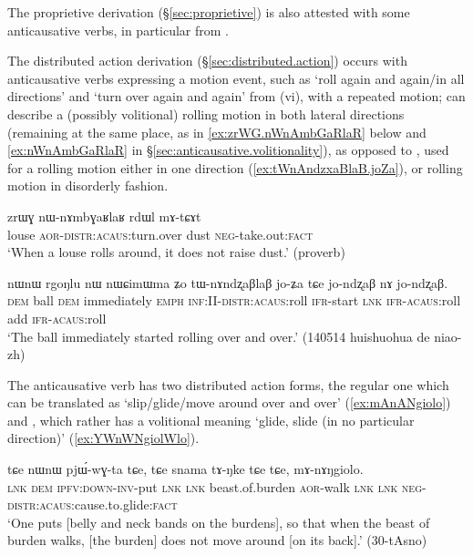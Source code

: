 The proprietive  derivation (§\ref{sec:proprietive}) is also attested with some anticausative verbs, in particular  from .

The distributed action derivation (§\ref{sec:distributed.action}) occurs with anticausative verbs expressing a motion event, such as  `roll again and again/in all directions' and  `turn over again and again'  from   (vi), with a repeated motion;  can describe a (possibly volitional) rolling motion in both lateral directions (remaining at the same place, as in \ref{ex:zrWG.nWnAmbGaRlaR} below and \ref{ex:nWnAmbGaRlaR} in §\ref{sec:anticausative.volitionality}), as opposed to , used for a rolling motion either in one direction (\ref{ex:tWnAndzxaBlaB.joZa}), or  rolling motion in disorderly fashion.

\begin{exe}
\ex \label{ex:zrWG.nWnAmbGaRlaR}
\gll  zrɯɣ nɯ-nɤmbɣaʁlaʁ rdɯl mɤ-tɕɤt \\
louse \textsc{aor}-\textsc{distr}:\textsc{acaus}:turn.over dust \textsc{neg}-take.out:\textsc{fact} \\
\glt `When a louse rolls around, it does not raise dust.' (proverb)
\end{exe}

\begin{exe}
\ex \label{ex:tWnAndzxaBlaB.joZa}
\gll nɯnɯ rgoŋlu nɯ nɯɕimɯma ʑo tɯ-nɤndʐaβlaβ jo-ʑa tɕe jo-ndʐaβ nɤ jo-ndʐaβ. \\
\textsc{dem} ball \textsc{dem} immediately \textsc{emph} \textsc{inf}:II-\textsc{distr}:\textsc{acaus}:roll \textsc{ifr}-start \textsc{lnk} \textsc{ifr}-\textsc{acaus}:roll add \textsc{ifr}-\textsc{acaus}:roll \\
\glt `The ball immediately started rolling over and over.' (140514 huishuohua de niao-zh)
\end{exe}


The anticausative verb  has two distributed action forms, the regular one  which can be translated as `slip/glide/move around over and over' (\ref{ex:mAnANgiolo}) and , which rather has a volitional meaning `glide, slide (in no particular direction)' (\ref{ex:YWnWNgiolWlo}).
 
\begin{exe}
\ex \label{ex:mAnANgiolo}
\gll tɕe nɯnɯ pjɯ́-wɣ-ta tɕe, tɕe snama tɤ-ŋke tɕe tɕe, mɤ-nɤŋgiolo.  \\
\textsc{lnk} \textsc{dem} \textsc{ipfv}:\textsc{down}-\textsc{inv}-put \textsc{lnk} \textsc{lnk} beast.of.burden \textsc{aor}-walk \textsc{lnk} \textsc{lnk} \textsc{neg}-\textsc{distr}:\textsc{acaus}:cause.to.glide:\textsc{fact} \\
\glt `One puts [belly and neck bands on the burdens], so that when the beast of burden walks, [the burden] does not move around [on its back].' (30-tAsno)
 \end{exe}
 
